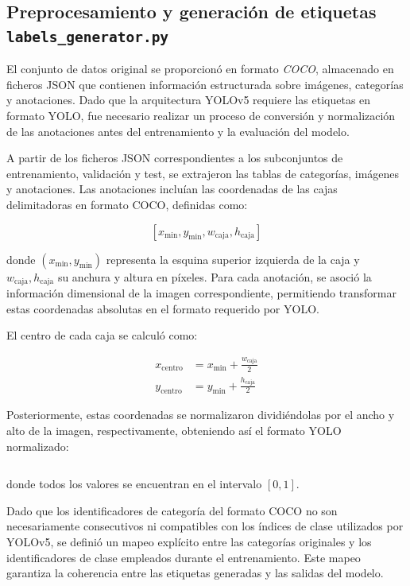 \documentclass{article}
\begin{document}
	\subsection{Preprocesamiento y generación de etiquetas \texttt{labels\_generator.py}}
	
	El conjunto de datos original se proporcionó en formato \textit{COCO}, almacenado en ficheros JSON que contienen información estructurada sobre imágenes, categorías y anotaciones. Dado que la arquitectura YOLOv5 requiere las etiquetas en formato YOLO, fue necesario realizar un proceso de conversión y normalización de las anotaciones antes del entrenamiento y la evaluación del modelo.
	
	A partir de los ficheros JSON correspondientes a los subconjuntos de entrenamiento, validación y test, se extrajeron las tablas de categorías, imágenes y anotaciones. Las anotaciones incluían las coordenadas de las cajas delimitadoras en formato COCO, definidas como:
	
	\[
	[x_{\min}, y_{\min}, w_{\text{caja}}, h_{\text{caja}}]
	\]
	
	donde $(x_{\min}, y_{\min})$ representa la esquina superior izquierda de la caja y $w_{\text{caja}}, h_{\text{caja}}$ su anchura y altura en píxeles. Para cada anotación, se asoció la información dimensional de la imagen correspondiente, permitiendo transformar estas coordenadas absolutas en el formato requerido por YOLO.
	
	El centro de cada caja se calculó como:
	
	\begin{align}
		x_{\text{centro}} &= x_{\min} + \frac{w_{\text{caja}}}{2} \\
		y_{\text{centro}} &= y_{\min} + \frac{h_{\text{caja}}}{2}
	\end{align}
	
	Posteriormente, estas coordenadas se normalizaron dividiéndolas por el ancho y alto de la imagen, respectivamente, obteniendo así el formato YOLO normalizado:
	
	\begin{equation}
		[x_{\text{centro}}^{\text{norm}}, y_{\text{centro}}^{\text{norm}}, w_{\text{caja}}^{\text{norm}}, h_{\text{caja}}^{\text{norm}}]
	\end{equation}
	
	donde todos los valores se encuentran en el intervalo $[0,1]$.
	
	Dado que los identificadores de categoría del formato COCO no son necesariamente consecutivos ni compatibles con los índices de clase utilizados por YOLOv5, se definió un mapeo explícito entre las categorías originales y los identificadores de clase empleados durante el entrenamiento. Este mapeo garantiza la coherencia entre las etiquetas generadas y las salidas del modelo.
	
\end{document}
